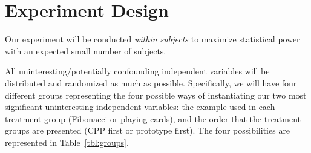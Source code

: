 \documentclass[11pt]{article}
\begin{document}
% 
% 
% 
% 
% 
% 
% 
% 
% 
% 
% 

\section{Experiment Design}
\label{sec:design}

Our experiment will be conducted \emph{within subjects} to maximize statistical
power with an expected small number of subjects.

All uninteresting/potentially confounding independent variables will be
distributed and randomized as much as possible.  Specifically, we will have
four different groups representing the four possible ways of instantiating our
two most significant uninteresting independent variables: the example used in each
treatment group (Fibonacci or playing cards), and the order that the treatment
groups are presented (CPP first or prototype first).  The four possibilities
are represented in Table~\ref{tbl:groups}.
\end{document}
